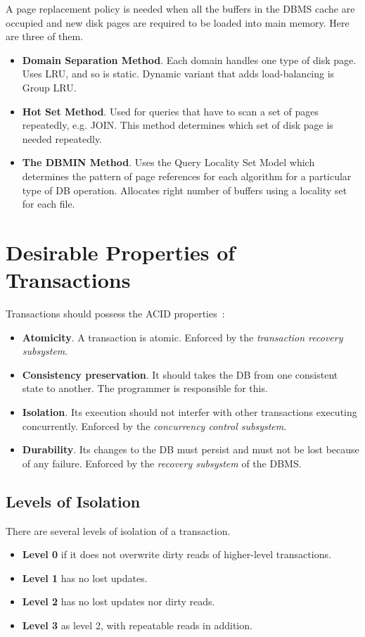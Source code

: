 A page replacement policy is needed when all the buffers in the DBMS cache are occupied and new disk pages are required to be loaded into main memory. Here are three of them.

\begin{itemize}
    \item \textbf{Domain Separation Method}. Each domain handles one type of disk page. Uses LRU, and so is static. Dynamic variant that adds load-balancing is Group LRU.
    \item \textbf{Hot Set Method}. Used for queries that have to scan a set of pages repeatedly, e.g. JOIN. This method determines which set of disk page is needed repeatedly.
    \item \textbf{The DBMIN Method}. Uses the Query Locality Set Model which determines the pattern of page references for each algorithm for a particular type of DB operation. Allocates right number of buffers using a locality set for each file.
\end{itemize}

\section{Desirable Properties of Transactions}
Transactions should possess the ACID properties~:

\begin{itemize}
    \item \textbf{Atomicity}. A transaction is atomic. Enforced by the \textit{transaction recovery subsystem}.
    \item \textbf{Consistency preservation}. It should takes the DB from one consistent state to another. The programmer is responsible for this.
    \item \textbf{Isolation}. Its execution should not interfer with other transactions executing concurrently. Enforced by the \textit{concurrency control subsystem}.
    \item \textbf{Durability}. Its changes to the DB must persist and must not be lost because of any failure. Enforced by the \textit{recovery subsystem} of the DBMS.
\end{itemize}

\subsection{Levels of Isolation}
There are several levels of isolation of a transaction.

\begin{itemize}
    \item \textbf{Level 0} if it does not overwrite dirty reads of higher-level transactions.
    \item \textbf{Level 1} has no lost updates.
    \item \textbf{Level 2} has no lost updates nor dirty reads.
    \item \textbf{Level 3} as level 2, with repeatable reads in addition.
\end{itemize}


